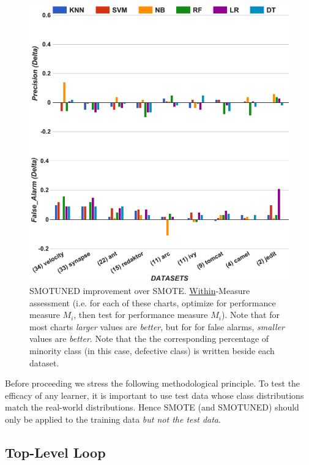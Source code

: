 \documentclass[10pt,conference]{IEEEtran}
\theoremstyle{break}
\theoremstyle{break}
\begin{document}
\begin{figure}[!t]
\begin{minipage}{.5\linewidth}
        \includegraphics[width=.95\linewidth]{./fig/prec_pf_tuned.png}
    \end{minipage}%
    
    \caption{SMOTUNED improvement over SMOTE. \underline{Within}-Measure
    assessment (i.e. for each of these charts,
    optimize for performance measure $M_i$, then test for
    performance measure $M_i$). Note that for most charts
    {\em larger} values are {\em better}, but for for false alarms,
    {\em smaller} values are {\em better}. Note that the the corresponding percentage of minority class (in this case, defective class) is written beside each dataset.}
    \label{fig:tuned}
\vspace{-0.5cm}
\end{figure}


Before proceeding 
we   stress the following methodological
principle.
To test the efficacy of any learner, it is important to
use test data whose class distributions match the real-world distributions.
Hence SMOTE (and SMOTUNED) should only
be applied to the training data {\em but
not the test data}.



\subsection{Top-Level Loop}
\end{document}
